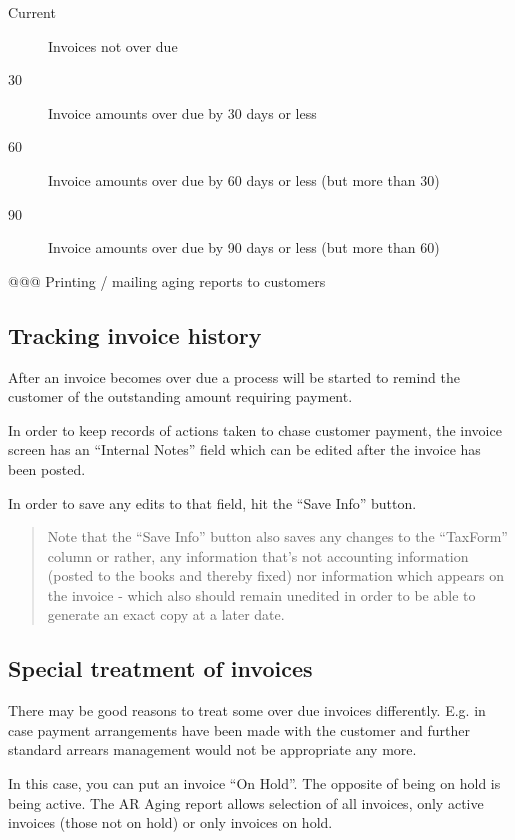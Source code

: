 \begin{description}
\item [Current] Invoices not over due
\item [30] Invoice amounts over due by 30 days or less
\item [60] Invoice amounts over due by 60 days or less (but more than 30)
\item [90] Invoice amounts over due by 90 days or less (but more than 60)
\end{description}


@@@ Printing / mailing aging reports to customers


\subsection{Tracking invoice history}

After an invoice becomes over due a process will be started to remind
the customer of the outstanding amount requiring payment.

In order to keep records of actions taken to chase customer payment,
the invoice screen has an ``Internal Notes'' field which can be edited
after the invoice has been posted.

In order to save any edits to that field, hit the ``Save Info'' button.

\begin{quotation}
Note that the ``Save Info'' button also saves any changes to the ``TaxForm'' column or
rather, any information that's not accounting information (posted to the books and
thereby fixed) nor information which appears on the invoice - which also should remain
unedited in order to be able to generate an exact copy at a later date.
\end{quotation}


\subsection{Special treatment of invoices}

There may be good reasons to treat some over due invoices differently. E.g. in case
payment arrangements have been made with the customer and further standard arrears
management would not be appropriate any more.

In this case, you can put an invoice ``On Hold''. The opposite of being on hold is
being active. The AR Aging report allows selection of all invoices, only active
invoices (those not on hold) or only invoices on hold.


